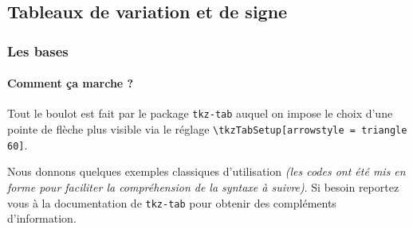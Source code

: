 \documentclass[12pt,a4paper]{article}
\begin{document}

\subsection{Tableaux de variation et de signe}

\subsubsection{Les bases}

\paragraph{Comment ça marche ?}

Tout le boulot est fait par le package \verb+tkz-tab+ auquel on impose le choix d'une pointe de flèche plus visible via le réglage \verb+\tkzTabSetup[arrowstyle = triangle 60]+.

\medskip

Nous donnons quelques exemples classiques d'utilisation \emph{(les codes ont été mis en forme pour faciliter la compréhension de la syntaxe à suivre)}.
Si besoin reportez vous à la documentation de \verb+tkz-tab+ pour obtenir des compléments d'information. 





\begin{latexex-flat}
\end{latexex-flat}





\begin{latexex-flat}
\end{latexex-flat}
\end{document}

